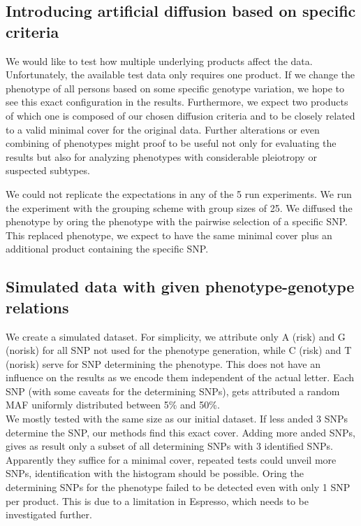 \documentclass[letterpaper, 11pt]{article}
\begin{document}
\subsection{Introducing artificial diffusion based on specific criteria}

We would like to test how multiple underlying products affect the data. Unfortunately, the available test data only requires one product. If we change the phenotype of all persons based on some specific genotype variation, we hope to see this exact configuration in the results. Furthermore, we expect two products of which one is composed of our chosen diffusion criteria and to be closely related to a valid minimal cover for the original data. Further alterations or even combining of phenotypes might proof to be useful not only for evaluating the results but also for analyzing phenotypes with considerable pleiotropy or suspected subtypes.

We could not replicate the expectations in any of the 5 run experiments. We run the experiment with the grouping scheme with group sizes of 25. We diffused the phenotype by oring the phenotype with the pairwise selection of a specific SNP. This replaced phenotype, we expect to have the same minimal cover plus an additional product containing the specific SNP.  
\subsection{Simulated data with given phenotype-genotype relations}

We create a simulated dataset. For simplicity, we attribute only A (risk) and G (norisk) for all SNP not used for the phenotype generation, while C (risk) and T (norisk) serve for SNP determining the phenotype. This does not have an influence on the results as we encode them independent of the actual letter. Each SNP (with some caveats for  the determining SNPs), gets attributed a random MAF uniformly distributed between 5\% and 50\%. \\

We mostly tested with the same size as our initial dataset. If less anded 3 SNPs determine the SNP, our methods find this exact cover. Adding more anded SNPs, gives as result only a subset of all determining SNPs with 3 identified SNPs. Apparently they suffice for a minimal cover, repeated tests could unveil more SNPs, identification with the histogram should be possible. 
Oring the determining SNPs for the phenotype failed to be detected even with only 1 SNP per product. This is due to a limitation in Espresso, which needs to be investigated further. 
\end{document}
